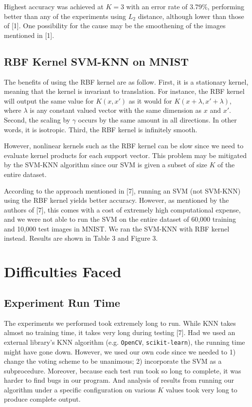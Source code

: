 \documentclass[11pt,letterpaper]{article}
\begin{document}
Highest accuracy was achieved at $K=3$ with an error rate of 3.79\%, performing better than any of the experiments using $L_2$ distance, although lower than those of [1]. One possibility for the cause may be the smoothening of the images mentioned in [1].


\subsection{RBF Kernel SVM-KNN on MNIST}

The benefits of using the RBF kernel are as follow. First, it is a stationary kernel, meaning that the kernel is invariant to translation. For instance, the RBF kernel will output the same value for $K(x,x')$ as it would for $K(x+\lambda, x'+\lambda)$, where $\lambda$ is any constant valued vector with the same dimension as $x$ and $x'$. Second, the scaling by $\gamma$ occurs by the same amount in all directions. In other words, it is isotropic. Third, the RBF kernel is infinitely smooth.

However, nonlinear kernels such as the RBF kernel can be slow since we need to evaluate kernel products for each support vector. This problem may be mitigated by the SVM-KNN algorithm since our SVM is given a subset of size $K$ of the entire dataset.

According to the approach mentioned in [7], running an SVM (not SVM-KNN) using the RBF kernel yields better accuracy. However, as mentioned by the authors of [7], this comes with a cost of extremely high computational expense, and we were not able to run the SVM on the entire dataset of 60,000 training and 10,000 test images in MNIST. We ran the SVM-KNN with RBF kernel instead. Results are shown in Table 3 and Figure 3.

\section{Difficulties Faced}

\subsection{Experiment Run Time}

The experiments we performed took extremely long to run. While KNN takes almost no training time, it takes very long during testing [7]. Had we used an external library's KNN algorithm (e.g. {\tt OpenCV}, {\tt scikit-learn}), the running time might have gone down. However, we used our own code since we needed to 1) change the voting scheme to be unanimous; 2) incorporate the SVM as a subprocedure. Moreover, because each test run took so long to complete, it was harder to find bugs in our program. And analysis of results from running our algorithm under a specific configuration on various $K$ values took very long to produce complete output.
\end{document}
